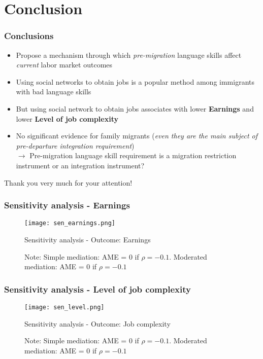 \documentclass{beamer}
\begin{document}
\section{Conclusion}

\begin{frame}
\frametitle{Conclusions}
\begin{itemize}
\item Propose a mechanism through which \textit{pre-migration} language skills affect \textit{current} labor market outcomes
\item Using social networks to obtain jobs is a popular method among immigrants with bad language skills
\item But using social network to obtain jobs associates with lower \textbf{Earnings} and lower \textbf{Level of job complexity}
\item No significant evidence for family migrants (\textit{even they are the main subject of pre-departure integration requirement}) \\
$\rightarrow$ Pre-migration language skill requirement is a migration restriction instrument or an integration instrument?
\end{itemize}

\end{frame}

\begin{frame}

\Large{\centerline{Thank you very much for your attention!}}

\end{frame}

\begin{frame}
\frametitle{Sensitivity analysis - Earnings}
\begin{figure}
\centering
\texttt{[image: sen\_earnings.png]}
  \caption{Sensitivity analysis - Outcome: Earnings}
\caption*{\small{Note: Simple mediation: AME = 0 if $\rho = -0.1$. Moderated mediation: AME = 0 if $\rho = -0.1$}}
\end{figure}
\end{frame}

\begin{frame}
\frametitle{Sensitivity analysis - Level of job complexity}
\begin{figure}
\centering
\texttt{[image: sen\_level.png]}
  \caption{Sensitivity analysis - Outcome: Job complexity}
\caption*{\small{Note: Simple mediation: AME = 0 if $\rho = -0.1$. Moderated mediation: AME = 0 if $\rho = -0.1 $}}
\end{figure}
\end{frame}
\end{document}
